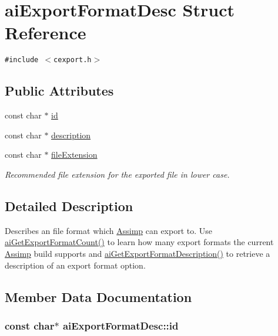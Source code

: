 \hypertarget{structai_export_format_desc}{
\section{aiExportFormatDesc Struct Reference}
\label{structai_export_format_desc}
}
{\tt \#include $<$cexport.h$>$}

\subsection*{Public Attributes}
\begin{CompactItemize}
\item 
const char $\ast$ \hyperlink{structai_export_format_desc_fe216eaea3a04abca041e5c253f94bbf}{id}
\item 
const char $\ast$ \hyperlink{structai_export_format_desc_9c84c4b07c5177fb6539b9bdf90236fb}{description}
\item 
\hypertarget{structai_export_format_desc_589d08d526f253176d09886787cd6b22}{
const char $\ast$ \hyperlink{structai_export_format_desc_589d08d526f253176d09886787cd6b22}{fileExtension}}
\label{structai_export_format_desc_589d08d526f253176d09886787cd6b22}

\begin{CompactList}\small\item\em Recommended file extension for the exported file in lower case. \item\end{CompactList}\end{CompactItemize}


\subsection{Detailed Description}
Describes an file format which \hyperlink{namespace_assimp}{Assimp} can export to. Use \hyperlink{cexport_8h_59cfffbc5b436da8ed8542108102b502}{aiGetExportFormatCount()} to learn how many export formats the current \hyperlink{namespace_assimp}{Assimp} build supports and \hyperlink{cexport_8h_dda7f2e6611f719af6c8a4a0bef0a0a2}{aiGetExportFormatDescription()} to retrieve a description of an export format option. 

\subsection{Member Data Documentation}
\hypertarget{structai_export_format_desc_fe216eaea3a04abca041e5c253f94bbf}{
\subsubsection[id]{\setlength{\rightskip}{0pt plus 5cm}const char$\ast$ {\bf aiExportFormatDesc::id}}}
\label{structai_export_format_desc_fe216eaea3a04abca041e5c253f94bbf}


